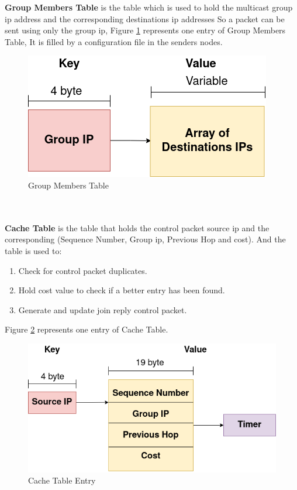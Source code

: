 \textbf{Group Members Table} is the table which is used to hold the multicast group \acrshort{ip} address and the corresponding destinations \acrshort{ip} addresses So a packet can be sent using only the group \acrshort{ip}, Figure \ref{fig:group-members-table-entry} represents one entry of Group Members Table, It is filled by a configuration file in the senders nodes.
\begin{figure}[!htbp]
    \centering
    \includegraphics[scale=0.7]{images/group-members-table-entry.png}
    \caption{Group Members Table}
    \label{fig:group-members-table-entry}
\end{figure}
\\
\\
\textbf{Cache Table} is the table that holds the control packet source \acrshort{ip} and the corresponding (Sequence Number, Group \acrshort{ip}, Previous Hop and cost). And the table is used to:
\begin{enumerate}
    \item Check for control packet duplicates.
    \item Hold cost value to check if a better entry has been found.
    \item Generate and update join reply control packet.
\end{enumerate}
Figure \ref{fig:cache-table-entry} represents one entry of Cache Table.
\begin{figure}[!htbp]
    \centering
    \includegraphics[width=\linewidth]{images/cache-table-entry.png}
    \caption{Cache Table Entry}
    \label{fig:cache-table-entry}
\end{figure}
